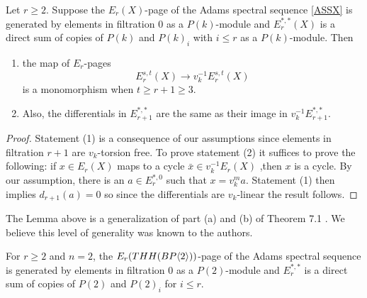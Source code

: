 \begin{lem}\label{mod p v_n}
Let $r\ge 2$. Suppose the $E_r(X)$-page of the Adams spectral sequence \eqref{ASSX} is generated by elements in filtration $0$ as a $P(k)$-module and $E_r^{*,*}(X)$ is a direct sum of copies of $P(k)$ and $P(k)_i$ with $i\le r$ as a $P(k)$-module. Then
\begin{enumerate}
\item{} the map of $E_r$-pages
\[ E_r^{s,t}(X) \to v_k^{-1}E_r^{s,t}(X) \]
is a monomorphism when $t\ge r+1\ge 3$. 
\item{} Also, the differentials in $E_{r+1}^{*,*}$ are the same as their image in $v_k^{-1}E_{r+1}^{*,*}$. 
\end{enumerate}
\end{lem}
\begin{proof}
Statement (1) is a consequence of our assumptions since elements in filtration $r+1$ are $v_k$-torsion free. 
To prove statement (2) it suffices to prove the following: if $x\in E_r(X)$ maps to a cycle $\bar{x}\in v_k^{-1}E_r(X)$ ,then $x$ is a cycle. By our assumption, there is an $a\in E_r^{*,0}$ such that $x=v_k^ma$. Statement (1) then implies $d_{r+1}(a)=0$ so since the differentials are $v_k$-linear the result follows. 
\end{proof}
\begin{rem}
The Lemma above is a generalization of part (a) and (b) of Theorem 7.1 \cite{McClureStaffeldt}. We believe this level of generality was known to the authors.
\end{rem}
\begin{lem} \label{lem mod p v_1}
For $r\ge 2$ and $n=2$, the $E_r(THH(BP\langle 2 \rangle))$-page of the Adams spectral sequence is generated by elements in filtration $0$ as a $P(2)$-module and $E_{r}^{*,*}$ is a direct sum of copies of $P(2)$ and $P(2)_i$ for $i\le r$. 
\end{lem}
